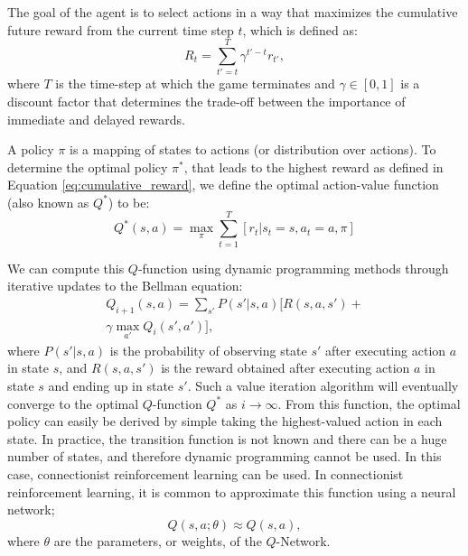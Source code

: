 The goal of the agent is to select actions in a way that maximizes the cumulative future reward from the current time step $t$, which is defined as:
\begin{equation}\label{eq:cumulative_reward}
	R_t = \sum_{t'=t}^{T} \gamma^{t'-t} r_{t'},
\end{equation}
where $T$ is the time-step at which the game terminates and $\gamma \in [0,1]$ is a discount factor that determines the trade-off between the importance of immediate and delayed rewards. 

A policy $\pi$ is a mapping of states to actions (or distribution over actions). To determine the optimal policy $\pi^*$, that leads to the highest reward as defined in Equation \eqref{eq:cumulative_reward}, we define the optimal action-value function (also known as $Q^*$) to be:
\begin{equation}\label{qfunction}
	Q^*(s, a) = \max_\pi \sum_{t=1}^T [r_t \vert s_t=s, a_t=a, \pi]
\end{equation}

We can compute this $Q$-function using dynamic programming methods through iterative updates to the Bellman equation:
\begin{equation}
	\begin{array}{c}
		Q_{i+1}(s, a) = \sum_{s'} P(s' \vert s, a) [R(s,a,s') + \\
		\gamma \max_{a'} Q_i(s', a')],
	\end{array}
\end{equation}
where $P(s'\vert s,a)$ is the probability of observing state $s'$ after executing action $a$ in state $s$, and $R(s,a,s')$ is the reward obtained after executing action $a$ in state $s$ and ending up in state $s'$.
Such a value iteration algorithm will eventually converge to the optimal $Q$-function $Q^*$ as $i \rightarrow \infty$. From this function, the optimal policy can easily be derived by simple taking the highest-valued action in each state. In practice, the transition function is not known and there can be a huge number of states, and therefore dynamic programming cannot be used. In this case, connectionist reinforcement learning can be used. In connectionist reinforcement learning, it is common to approximate this function using a neural network;
\begin{equation}
	Q(s, a; \theta) \approx Q(s, a),
\end{equation}
where $\theta$ are the parameters, or weights, of the $Q$-Network.